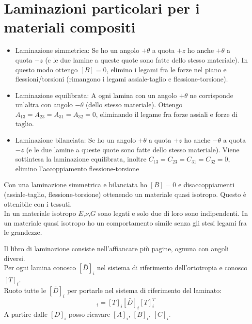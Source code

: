 \section{Laminazioni particolari per i materiali compositi}

\begin{itemize}
    \item Laminazione simmetrica:
    Se ho un angolo $+\theta$ a quota $+z$ ho anche $+\theta$ a quota $-z$ (e le due lamine a queste quote sono fatte dello stesso materiale).
    In questo modo ottengo $[B]=0$, elimino i legami fra le forze nel piano e flessioni/torsioni (rimangono i legami assiale-taglio e flessione-torsione).\\
    \item Laminazione equilibrata:
    A ogni lamina con un angolo  $+\theta$ ne corrisponde un'altra con angolo  $-\theta$ (dello stesso materiale).
    Ottengo $A_{13}=A_{23}=A_{31}=A_{32}=0$, eliminando il legame fra forze assiali e forze di taglio.\\
    \item Laminazione bilanciata:
    Se ho un angolo $+\theta$ a quota $+z$ ho anche $-\theta$ a quota $-z$ (e le due lamine a queste quote sono fatte dello stesso materiale).
    Viene sottintesa la laminazione equilibrata, inoltre  $C_{13}=C_{23}=C_{31}=C_{32}=0$, elimino l'accoppiamento flessione-torsione
\end{itemize}

Con una laminazione simmetrica e bilanciata ho $[B]=0$ e disaccoppiamenti (assiale-taglio, flessione-torsione) ottenendo un materiale quasi isotropo. Questo è ottenibile con i tessuti.\\
In un materiale isotropo $E$,$\nu$,$G$ sono legati e solo due di loro sono indipendenti. In un materiale quasi isotropo ho un comportamento simile senza gli stesi legami fra le grandezze.

Il libro di laminazione consiste nell'affiancare più pagine, ognuna con angoli diversi. \\
Per ogni lamina conosco $[\bar{D}]_i$ nel sistema di riferimento dell'ortotropia e conosco $[T]_i$.\\
Ruoto tutte le $[\bar{D}]_i$ per portarle nel sistema di riferimento del laminato:
\begin{equation*}
    [D]_i =  [T]_i [\bar{D}]_i[T]_i^T
\end{equation*}
A partire dalle $[D]_i$ posso ricavare $[A]_i$, $[B]_i$, $[C]_i$.

